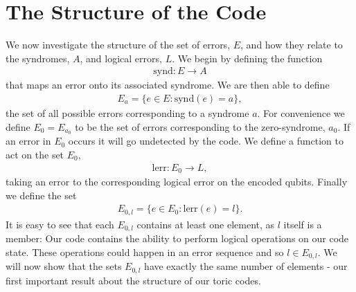 \section{The Structure of the Code}

We now investigate the structure of the set of errors, $E$, and how they relate to the syndromes, $A$, and logical errors, $L$. We begin by defining the function
\begin{align}
  \text{synd}: E \rightarrow A
\end{align}
that maps an error onto its associated syndrome. We are then able to define
\begin{align}
  E_a = \{ e\in E : \text{synd}(e) = a \},
\end{align}
the set of all possible errors corresponding to a syndrome $a$. For convenience we define $E_0 = E_{a_0}$ to be the set of errors corresponding to the zero-syndrome, $a_0$. If an error in $E_0$ occurs it will go undetected by the code. We define a function to act on the set $E_0$,
\begin{align}
  \text{lerr}: E_0 \rightarrow L,
\end{align}
taking an error to the corresponding logical error on the encoded qubits. Finally we define the set
\begin{align}
  E_{0, l} = \{ e\in E_0: \text{lerr}(e) = l \}.
\end{align}
It is easy to see that each $E_{0, l}$ contains at least one element, as $l$ itself is a member: Our code contains the ability to perform logical operations on our code state. These operations could happen in an error sequence and so $l \in E_{0,l}$. We will now show that the sets $E_{0,l}$ have exactly the same number of elements - our first important result about the structure of our toric codes.


